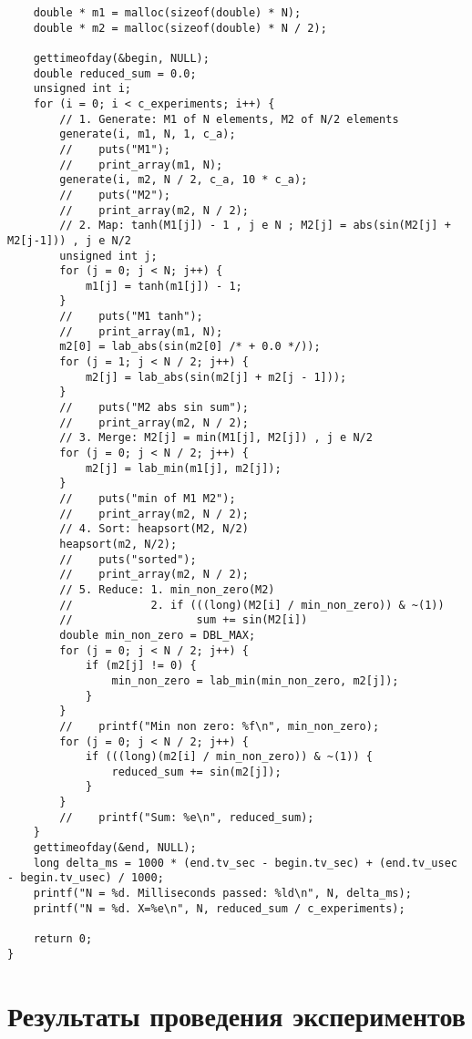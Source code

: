 \documentclass[a4paper,14pt,russian]{extarticle}
\begin{document}
\begin{lstlisting}
    double * m1 = malloc(sizeof(double) * N);
    double * m2 = malloc(sizeof(double) * N / 2);

    gettimeofday(&begin, NULL);
    double reduced_sum = 0.0;
    unsigned int i;
    for (i = 0; i < c_experiments; i++) {
        // 1. Generate: M1 of N elements, M2 of N/2 elements
        generate(i, m1, N, 1, c_a);
        //    puts("M1");
        //    print_array(m1, N);
        generate(i, m2, N / 2, c_a, 10 * c_a);
        //    puts("M2");
        //    print_array(m2, N / 2);
        // 2. Map: tanh(M1[j]) - 1 , j e N ; M2[j] = abs(sin(M2[j] + M2[j-1])) , j e N/2
        unsigned int j;
        for (j = 0; j < N; j++) {
            m1[j] = tanh(m1[j]) - 1;
        }
        //    puts("M1 tanh");
        //    print_array(m1, N);
        m2[0] = lab_abs(sin(m2[0] /* + 0.0 */));
        for (j = 1; j < N / 2; j++) {
            m2[j] = lab_abs(sin(m2[j] + m2[j - 1]));
        }
        //    puts("M2 abs sin sum");
        //    print_array(m2, N / 2);
        // 3. Merge: M2[j] = min(M1[j], M2[j]) , j e N/2
        for (j = 0; j < N / 2; j++) {
            m2[j] = lab_min(m1[j], m2[j]);
        }
        //    puts("min of M1 M2");
        //    print_array(m2, N / 2);
        // 4. Sort: heapsort(M2, N/2)
        heapsort(m2, N/2);
        //    puts("sorted");
        //    print_array(m2, N / 2);
        // 5. Reduce: 1. min_non_zero(M2)
        //            2. if (((long)(M2[i] / min_non_zero)) & ~(1))
        //                   sum += sin(M2[i])
        double min_non_zero = DBL_MAX;
        for (j = 0; j < N / 2; j++) {
            if (m2[j] != 0) {
                min_non_zero = lab_min(min_non_zero, m2[j]);
            }
        }
        //    printf("Min non zero: %f\n", min_non_zero);
        for (j = 0; j < N / 2; j++) {
            if (((long)(m2[i] / min_non_zero)) & ~(1)) {
                reduced_sum += sin(m2[j]);
            }
        }
        //    printf("Sum: %e\n", reduced_sum);
    }
    gettimeofday(&end, NULL);
    long delta_ms = 1000 * (end.tv_sec - begin.tv_sec) + (end.tv_usec - begin.tv_usec) / 1000;
    printf("N = %d. Milliseconds passed: %ld\n", N, delta_ms);
    printf("N = %d. X=%e\n", N, reduced_sum / c_experiments);

    return 0;
}

\end{lstlisting}

\newpage


\section{Результаты проведения экспериментов}
\end{document}
